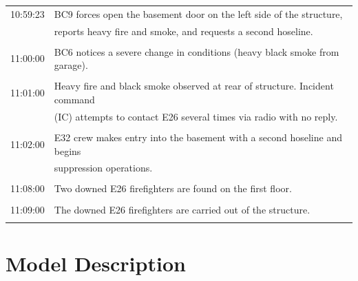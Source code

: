 \documentclass[12pt,oneside]{book}
\begin{document}
\begin{table}[!ht]
\begin{tabular}{cl}
10:59:23       &  BC9 forces open the basement door on the left side of the structure,                \\
               &  reports heavy fire and smoke, and requests a second hoseline.                       \\
               &                                                                                      \\
11:00:00       &  BC6 notices a severe change in conditions (heavy black smoke from garage).          \\
               &                                                                                      \\
11:01:00       &  Heavy fire and black smoke observed at rear of structure. Incident command          \\
               &  (IC) attempts to contact E26 several times via radio with no reply.                 \\
               &                                                                                      \\
11:02:00       &  E32 crew makes entry into the basement with a second hoseline and begins            \\
               &  suppression operations.                                                             \\
               &                                                                                      \\
11:08:00       &  Two downed E26 firefighters are found on the first floor.                           \\
               &                                                                                      \\
11:09:00       &  The downed E26 firefighters are carried out of the structure.                       \\
               &                                                                                      \\
\bottomrule
\end{tabular}
\label{tab:incident_timeline}
\end{table}


\chapter{Model Description}
\label{sec:model_description}
\end{document}

